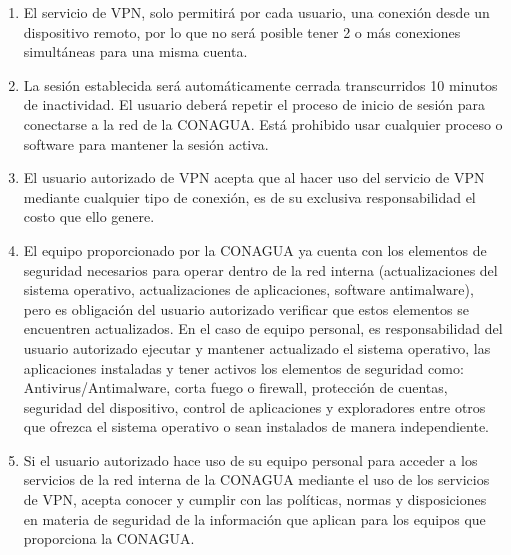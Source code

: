 \documentclass[letterpaper,11pt]{article}
\begin{document}
{\begin{enumerate}
	\item El servicio de VPN, solo permitirá por cada usuario, una conexión desde un dispositivo remoto, por lo que no será posible tener 2 o más conexiones simultáneas para una misma cuenta.
	\item La sesión establecida será automáticamente cerrada transcurridos 10 minutos de inactividad. El usuario deberá repetir el proceso de inicio de sesión para conectarse a la red de la CONAGUA. Está prohibido usar cualquier proceso o software para mantener la sesión activa.
	\item El usuario autorizado de VPN acepta que al hacer uso del servicio de VPN mediante cualquier tipo de conexión, es de su exclusiva responsabilidad el costo que ello genere.
    \item El equipo proporcionado por la CONAGUA ya cuenta con los elementos de seguridad necesarios para operar dentro de la red interna (actualizaciones del sistema operativo, actualizaciones de aplicaciones, software antimalware), pero es obligación del usuario autorizado verificar que estos elementos se encuentren actualizados. En el caso de equipo personal, es responsabilidad del usuario autorizado ejecutar y mantener actualizado el sistema operativo, las aplicaciones instaladas y tener activos los elementos de seguridad como: Antivirus/Antimalware, corta fuego o firewall, protección de cuentas, seguridad del dispositivo, control de aplicaciones y exploradores entre otros que ofrezca el sistema operativo o sean instalados de manera independiente.
    \item Si el usuario autorizado hace uso de su equipo personal para acceder a los servicios de la red interna de la CONAGUA mediante el uso de los servicios de VPN, acepta conocer y cumplir con las políticas, normas y disposiciones en materia de seguridad de la información que aplican para los equipos que proporciona la CONAGUA.

\end{enumerate}}
\end{document}
